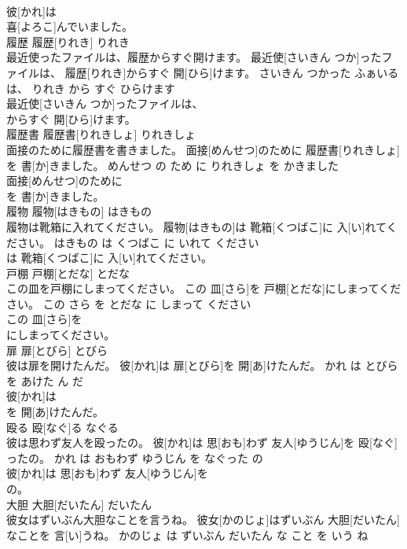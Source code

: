 \documentclass[8pt]{extreport}
\begin{document}
\begin{CJK}{UTF8}{min}
\\	彼[かれ]は
\\	喜[よろこ]んでいました。			
\\	履歴	履歴[りれき]	りれき	
\\	最近使ったファイルは、履歴からすぐ開けます。	最近使[さいきん つか]ったファイルは、 履歴[りれき]からすぐ 開[ひら]けます。	さいきん つかった ふぁいる は、 りれき から すぐ ひらけます	
\\	最近使[さいきん つか]ったファイルは、
\\	からすぐ 開[ひら]けます。			
\\	履歴書	履歴書[りれきしょ]	りれきしょ	
\\	面接のために履歴書を書きました。	面接[めんせつ]のために 履歴書[りれきしょ]を 書[か]きました。	めんせつ の ため に りれきしょ を かきました	
\\	面接[めんせつ]のために
\\	を 書[か]きました。			
\\	履物	履物[はきもの]	はきもの	
\\	履物は靴箱に入れてください。	履物[はきもの]は 靴箱[くつばこ]に 入[い]れてください。	はきもの は くつばこ に いれて ください	
\\	は 靴箱[くつばこ]に 入[い]れてください。			
\\	戸棚	戸棚[とだな]	とだな	
\\	この皿を戸棚にしまってください。	この 皿[さら]を 戸棚[とだな]にしまってください。	この さら を とだな に しまって ください	
\\	この 皿[さら]を
\\	にしまってください。			
\\	扉	扉[とびら]	とびら	
\\	彼は扉を開けたんだ。	彼[かれ]は 扉[とびら]を 開[あ]けたんだ。	かれ は とびら を あけた ん だ	
\\	彼[かれ]は
\\	を 開[あ]けたんだ。			
\\	殴る	殴[なぐ]る	なぐる	
\\	彼は思わず友人を殴ったの。	彼[かれ]は 思[おも]わず 友人[ゆうじん]を 殴[なぐ]ったの。	かれ は おもわず ゆうじん を なぐった の	
\\	彼[かれ]は 思[おも]わず 友人[ゆうじん]を
\\	の。			
\\	大胆	大胆[だいたん]	だいたん	
\\	彼女はずいぶん大胆なことを言うね。	彼女[かのじょ]はずいぶん 大胆[だいたん]なことを 言[い]うね。	かのじょ は ずいぶん だいたん な こと を いう ね	

\end{CJK}
\end{document}
